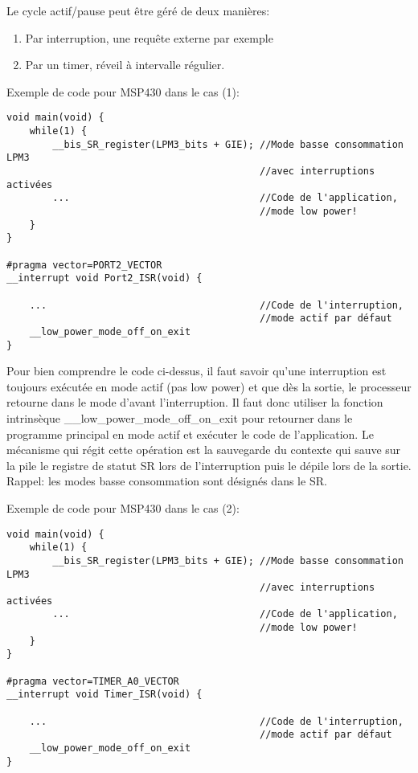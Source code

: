 Le cycle actif/pause peut être géré de deux manières:
\begin{enumerate}
\item Par interruption, une requête externe par exemple
\item Par un timer, réveil à intervalle régulier.
\end{enumerate}

Exemple de code pour MSP430 dans le cas (1):
\lstset{style=customc}
\begin{lstlisting}
void main(void) {
	while(1) {
		__bis_SR_register(LPM3_bits + GIE);	//Mode basse consommation LPM3 
											//avec interruptions activées
		...									//Code de l'application, 
											//mode low power!
	}
}

#pragma vector=PORT2_VECTOR
__interrupt void Port2_ISR(void) {

	...										//Code de l'interruption, 
											//mode actif par défaut
	__low_power_mode_off_on_exit	
}
\end{lstlisting}

Pour bien comprendre le code ci-dessus, il faut savoir qu'une interruption est toujours exécutée en mode actif (pas low power) et que dès la sortie, le processeur retourne dans le mode d'avant l'interruption. Il faut donc utiliser la fonction intrinsèque \_\_low\_power\_mode\_off\_on\_exit pour retourner dans le programme principal en mode actif et exécuter le code de l'application. Le mécanisme qui régit cette opération est la sauvegarde du contexte qui sauve sur la pile le registre de statut SR lors de l'interruption puis le dépile lors de la sortie. Rappel: les modes basse consommation sont désignés dans le SR.

Exemple de code pour MSP430 dans le cas (2):
\lstset{style=customc}
\begin{lstlisting}
void main(void) {
	while(1) {		
		__bis_SR_register(LPM3_bits + GIE);	//Mode basse consommation LPM3 
											//avec interruptions activées
		...									//Code de l'application, 
											//mode low power!
	}
}

#pragma vector=TIMER_A0_VECTOR
__interrupt void Timer_ISR(void) {

	...										//Code de l'interruption, 
											//mode actif par défaut
	__low_power_mode_off_on_exit	
}
\end{lstlisting}
 